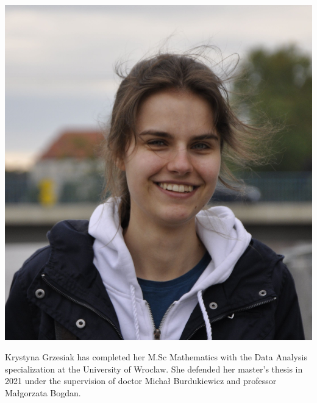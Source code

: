 \documentclass[]{MathAppl18}
\begin{document}
\begin{minipage}{0.2\textwidth}
        \includegraphics[width=1\textwidth]{Figures/Krystyna.JPG}
\end{minipage}
\hspace{0.01\textwidth}
\begin{minipage}{0.7\textwidth}
    Krystyna Grzesiak has completed her  M.Sc Mathematics with the Data Analysis specialization at the University of Wroclaw. She defended her master's thesis in 2021 under the supervision of doctor Michał Burdukiewicz and professor Małgorzata Bogdan. 
\end{minipage}
\end{document}
